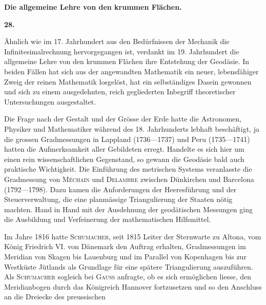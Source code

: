 \clearpage\begingroup{}
\renewcommand{\thefootnote}{\arabic{footnote})}\setcounter{footnote}{0}
\begin{center}
\par\smallskip
\textbf{Die allgemeine Lehre von den krummen Flächen.}\par\medskip
\textbf{28.}\par\smallskip
{}
\end{center}
\noindent\hspace*{\parindent}Ähnlich wie im 17. Jahrhundert aus den Bedürfnissen der Mechanik die
Infinitesimalrechnung hervorgegangen ist, verdankt im 19. Jahrhundert die
allgemeine Lehre von den krummen Flächen ihre Entstehung der Geodäsie.
In beiden Fällen hat sich aus der angewandten Mathematik ein neuer, lebensfähiger
Zweig der reinen Mathematik losgelöst, hat ein selbständiges Dasein
gewonnen und sich zu einem ausgedehnten, reich gegliederten Inbegriff theoretischer
Untersuchungen ausgestaltet.
\par
Die Frage nach der Gestalt und der Grösse der Erde hatte die Astronomen,
Physiker und Mathematiker während des 18. Jahrhunderts lebhaft beschäftigt,
ja die grossen Gradmessungen in Lappland (1736—1737) und Peru
(1735—1741) hatten die Aufmerksamkeit aller Gebildeten erregt. Handelte
es sich hier um einen rein wissenschaftlichen Gegenstand, so gewann die
Geodäsie bald auch praktische Wichtigkeit. Die Einführung des metrischen
Systems veranlasste die Gradmessung von \textsc{Méchain} und \textsc{Delambre} zwischen
Dünkirchen und Barcelona (1792—1798). Dazu kamen die Anforderungen
der Heeresführung und der Steuerverwaltung, die eine planmässige Triangulierung
der Staaten nötig machten. Hand in Hand mit der Ausdehnung der
geodätischen Messungen ging die Ausbildung und Verfeinerung der mathematischen
Hilfsmittel.
\par
Im Jahre 1816 hatte \textsc{Schumacher}, seit 1815 Leiter der Sternwarte zu
Altona, vom König Friedrich VI. von Dänemark den Auftrag erhalten, Gradmessungen
im Meridian von Skagen bis Lauenburg und im Parallel von
Kopenhagen bis zur Westküste Jütlands als Grundlage für eine spätere Triangulierung
auszuführen. Als \textsc{Schumacher} sogleich bei \textsc{Gauss} anfragte, ob es
sich ermöglichen liesse, den Meridianbogen durch das Königreich Hannover
fortzusetzen und so den Anschluss an die Dreiecke des preussischen
\clearpage{}\setcounter{footnote}{0}

